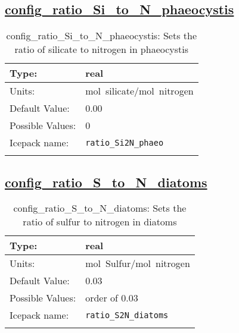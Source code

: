 \subsection[config\_ratio\_Si\_to\_N\_phaeocystis]{\hyperref[sec:nm_tab_biogeochemistry]{config\_ratio\_Si\_to\_N\_phaeocystis}}
\label{subsec:nm_sec_config_ratio_Si_to_N_phaeocystis}
\begin{center}
\begin{longtable}{| p{2.0in} || p{4.0in} |}
    \hline
    Type: & real \\
    \hline
    Units: & \si{mol.silicate/mol.nitrogen} \\
    \hline
    Default Value: & 0.00 \\
    \hline
    Possible Values: & 0 \\
    \hline
    \hline
    Icepack name: & \verb+ratio_Si2N_phaeo+ \\
    \caption{config\_ratio\_Si\_to\_N\_phaeocystis: Sets the ratio of silicate to nitrogen in phaeocystis}
\end{longtable}
\end{center}
\subsection[config\_ratio\_S\_to\_N\_diatoms]{\hyperref[sec:nm_tab_biogeochemistry]{config\_ratio\_S\_to\_N\_diatoms}}
\label{subsec:nm_sec_config_ratio_S_to_N_diatoms}
\begin{center}
\begin{longtable}{| p{2.0in} || p{4.0in} |}
    \hline
    Type: & real \\
    \hline
    Units: & \si{mol.Sulfur/mol.nitrogen} \\
    \hline
    Default Value: & 0.03 \\
    \hline
    Possible Values: & order of 0.03 \\
    \hline
    \hline
    Icepack name: & \verb+ratio_S2N_diatoms+ \\
    \caption{config\_ratio\_S\_to\_N\_diatoms: Sets the ratio of sulfur to nitrogen in diatoms}
\end{longtable}
\end{center}
